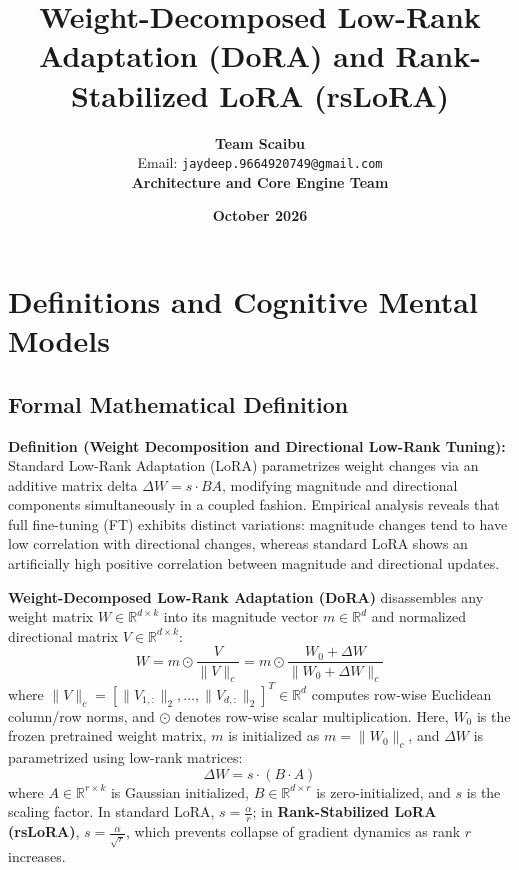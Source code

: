 \documentclass[11pt,a4paper]{article}
\title{\textbf{Weight-Decomposed Low-Rank Adaptation (DoRA) and Rank-Stabilized LoRA (rsLoRA)}}
\author{\textbf{Team Scaibu} \\ \small Email: \texttt{jaydeep.9664920749@gmail.com} \\ \small \textbf{Architecture and Core Engine Team}}
\date{\textbf{October 2026}}
\theoremstyle{definition}
\begin{document}
\maketitle

\section{Definitions and Cognitive Mental Models}

\subsection{Formal Mathematical Definition}
\textbf{Definition (Weight Decomposition and Directional Low-Rank Tuning):}
Standard Low-Rank Adaptation (LoRA) parametrizes weight changes via an additive matrix delta $\Delta W = s \cdot BA$, modifying magnitude and directional components simultaneously in a coupled fashion. Empirical analysis reveals that full fine-tuning (FT) exhibits distinct variations: magnitude changes tend to have low correlation with directional changes, whereas standard LoRA shows an artificially high positive correlation between magnitude and directional updates.

\textbf{Weight-Decomposed Low-Rank Adaptation (DoRA)} disassembles any weight matrix $W \in \mathbb{R}^{d \times k}$ into its magnitude vector $m \in \mathbb{R}^d$ and normalized directional matrix $V \in \mathbb{R}^{d \times k}$:
{\boldmath
\begin{equation}
W = m \odot \frac{V}{\|V\|_c} = m \odot \frac{W_0 + \Delta W}{\|W_0 + \Delta W\|_c}
\end{equation}
}
where $\|V\|_c = \left[ \|V_{1,:}\|_2, \dots, \|V_{d,:}\|_2 \right]^T \in \mathbb{R}^d$ computes row-wise Euclidean column/row norms, and $\odot$ denotes row-wise scalar multiplication.
Here, $W_0$ is the frozen pretrained weight matrix, $m$ is initialized as $m = \|W_0\|_c$, and $\Delta W$ is parametrized using low-rank matrices:
{\boldmath
\begin{equation}
\Delta W = s \cdot (B \cdot A)
\end{equation}
}
where $A \in \mathbb{R}^{r \times k}$ is Gaussian initialized, $B \in \mathbb{R}^{d \times r}$ is zero-initialized, and $s$ is the scaling factor. In standard LoRA, $s = \frac{\alpha}{r}$; in \textbf{Rank-Stabilized LoRA (rsLoRA)}, $s = \frac{\alpha}{\sqrt{r}}$, which prevents collapse of gradient dynamics as rank $r$ increases.
\end{document}
